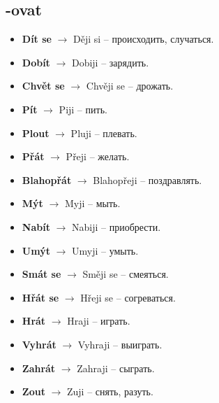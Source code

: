 \documentclass[12pt]{book}
\begin{document}
\subsection{-ovat}
\begin{itemize}
    \item \textbf{Dít se} $\rightarrow$ Ději si -- \textrussian{происходить, случаться}.
    \item \textbf{Dobít} $\rightarrow$ Dobiji -- \textrussian{зарядить}.
    \item \textbf{Chvět se} $\rightarrow$ Chvěji se -- \textrussian{дрожать}.
    \item \textbf{Pít} $\rightarrow$ Piji -- \textrussian{пить}.
    \item \textbf{Plout} $\rightarrow$ Pluji -- \textrussian{плевать}.
    \item \textbf{Přát} $\rightarrow$ Přeji -- \textrussian{желать}.
    \item \textbf{Blahopřát} $\rightarrow$ Blahopřeji -- \textrussian{поздравлять}.
    \item \textbf{Mýt} $\rightarrow$ Myji -- \textrussian{мыть}.
    \item \textbf{Nabít} $\rightarrow$ Nabiji -- \textrussian{приобрести}.
    \item \textbf{Umýt} $\rightarrow$ Umyji -- \textrussian{умыть}.
    \item \textbf{Smát se} $\rightarrow$ Směji se -- \textrussian{смеяться}.
    \item \textbf{Hřát se} $\rightarrow$ Hřeji se -- \textrussian{согреваться}.
    \item \textbf{Hrát} $\rightarrow$ Hraji -- \textrussian{играть}.
    \item \textbf{Vyhrát} $\rightarrow$ Vyhraji -- \textrussian{выиграть}.
    \item \textbf{Zahrát} $\rightarrow$ Zahraji -- \textrussian{сыграть}.
    \item \textbf{Zout} $\rightarrow$ Zuji -- \textrussian{снять, разуть}.
\end{itemize}
\end{document}

